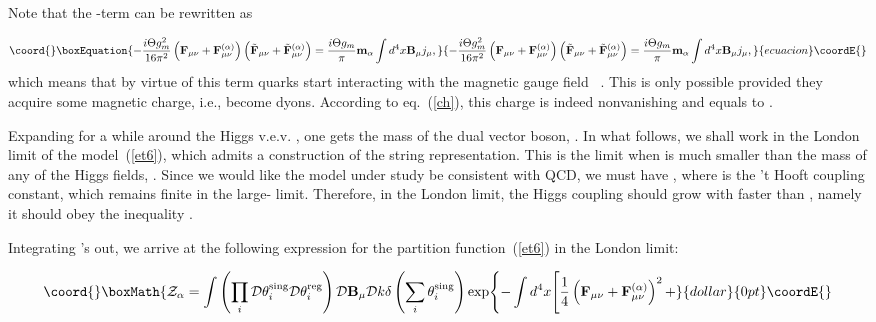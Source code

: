 \documentclass[a4paper,12pt]{article}
\begin{document}
Note that the \myHighlight{$\Theta$}\coordHE{}-term can be rewritten as

\begin{equation}\coord{}\boxEquation{
\label{ch}
-\frac{i\Theta g_m^2}{16\pi^2}
\left({\bf F}_{\mu\nu}+{\bf F}_{\mu\nu}^{(\alpha)}\right)
\left(\tilde{\bf F}_{\mu\nu}+\tilde{\bf F}_{\mu\nu}^{(\alpha)}\right)=\frac{i\Theta g_m}{\pi}{\bf m}_\alpha
\int d^4x{\bf B}_\mu j_\mu,
}{
-\frac{i\Theta g_m^2}{16\pi^2}
\left({\bf F}_{\mu\nu}+{\bf F}_{\mu\nu}^{(\alpha)}\right)
\left(\tilde{\bf F}_{\mu\nu}+\tilde{\bf F}_{\mu\nu}^{(\alpha)}\right)=\frac{i\Theta g_m}{\pi}{\bf m}_\alpha
\int d^4x{\bf B}_\mu j_\mu,
}{ecuacion}\coordE{}\end{equation}
which means that by virtue of this term quarks start interacting with the magnetic gauge field \coordHE{}~\cite{witten}.
This is only possible provided they
acquire some magnetic charge, i.e., become dyons. According to eq.~(\ref{ch}), this charge is indeed nonvanishing and
equals to \coordHE{}.



Expanding for a while \coordHE{} around the Higgs v.e.v. \myHighlight{$\eta$}\coordHE{}, one gets the mass of the dual vector boson,
\coordHE{}. In what follows, we shall work in the London limit of the model~(\ref{et6}),
which admits a construction of the string representation. This is the limit when \coordHE{} is much smaller
than the mass of any of the Higgs fields, \coordHE{}. Since we would like
the model under study be consistent with QCD, we must have \coordHE{}, where \myHighlight{$\bar\lambda$}\coordHE{}
is the 't Hooft coupling constant, which remains finite in the large-\coordHE{} limit. Therefore, in the London limit,
the Higgs coupling \myHighlight{$\lambda$}\coordHE{} should grow with \coordHE{} faster than \coordHE{}, namely it should obey the
inequality \coordHE{}.

Integrating \coordHE{}'s out, we arrive at the following expression for the partition function~(\ref{et6})
in the London limit:

$$\coord{}\boxMath{
{\cal Z}_\alpha=\int\left(\prod\limits_{i}^{}
{\cal D}\theta_i^{\rm sing}{\cal D}\theta_i^{\rm reg}\right) {\cal D}{\bf B}_\mu{\cal D}k
\delta\left(\sum\limits_{i}^{}
\theta_i^{\rm sing}\right)\exp\Biggl\{-\int d^4x\Biggl[\frac14\left({\bf F}_{\mu\nu}+{\bf F}_{\mu\nu}^{(\alpha)}\right)^2+}{dollar}{0pt}\coordE{}$$
\end{document}
